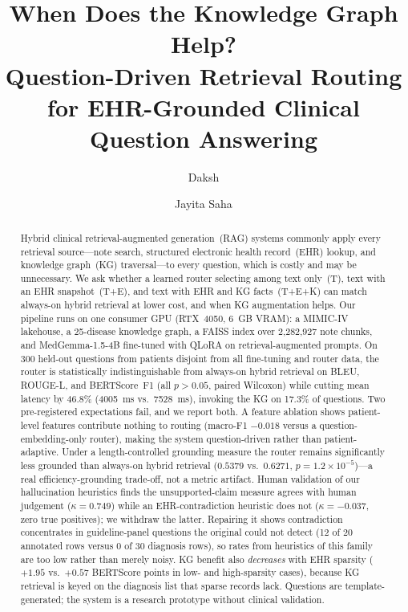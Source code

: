 \documentclass[preprint,12pt]{elsarticle}
\begin{document}
\begin{frontmatter}

\title{When Does the Knowledge Graph Help?\\
Question-Driven Retrieval Routing for EHR-Grounded Clinical Question Answering}

\author[inst1]{Daksh}

\author[inst1]{Jayita Saha}


\begin{abstract}
Hybrid clinical retrieval-augmented generation~(RAG) systems commonly
apply every retrieval source---note search, structured electronic
health record~(EHR) lookup, and knowledge graph~(KG) traversal---to
every question, which is costly and may be unnecessary. We ask whether
a learned router selecting among text only~(T), text with an EHR
snapshot~(T+E), and text with EHR and KG facts~(T+E+K) can match
always-on hybrid retrieval at lower cost, and when KG augmentation
helps. Our pipeline runs on one consumer GPU (RTX~4050, 6~GB VRAM):
a MIMIC-IV lakehouse, a 25-disease knowledge graph, a FAISS index over
2{,}282{,}927 note chunks, and MedGemma-1.5-4B fine-tuned with QLoRA
on retrieval-augmented prompts. On 300 held-out questions from
patients disjoint from all fine-tuning and router data, the router is
statistically indistinguishable from
always-on hybrid retrieval on BLEU, ROUGE-L, and BERTScore~F1 (all
$p > 0.05$, paired Wilcoxon) while cutting mean latency by 46.8\%
(4005~ms vs.\ 7528~ms), invoking the KG on 17.3\% of questions. Two
pre-registered expectations fail, and we report both. A feature
ablation shows patient-level features contribute nothing to routing
(macro-F1 $-0.018$ versus a question-embedding-only router), making
the system question-driven rather than patient-adaptive.
Under a length-controlled grounding measure the router remains
significantly less grounded than always-on hybrid retrieval ($0.5379$
vs.\ $0.6271$, $p = 1.2\times10^{-5}$)---a real efficiency-grounding
trade-off, not a metric artifact. Human validation of our hallucination
heuristics finds the unsupported-claim measure agrees with human
judgement ($\kappa = 0.749$) while an EHR-contradiction heuristic does
not ($\kappa = -0.037$, zero true positives); we withdraw the latter.
Repairing it shows contradiction concentrates in guideline-panel
questions the original could not detect (12 of 20 annotated rows versus
0 of 30 diagnosis rows), so rates from heuristics of this family are too
low rather than merely noisy. KG benefit also \textit{decreases}
with EHR sparsity ($+1.95$ vs.\ $+0.57$ BERTScore points in low- and
high-sparsity cases), because KG retrieval is keyed on the diagnosis
list that sparse records lack. Questions are template-generated; the
system is a research prototype without clinical validation.
\end{abstract}


\end{frontmatter}
\end{document}
